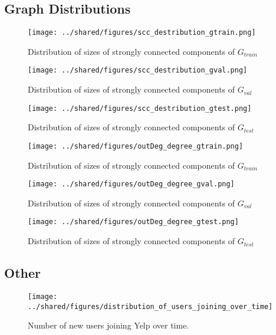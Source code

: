 \documentclass[letterpaper, 10 pt, conference]{ieeeconf}  %
\begin{document}
\subsection{Graph Distributions}
\label{sec:graph_distributions}
\begin{figure}[h!]
\centering
\texttt{[image: ../shared/figures/scc\_destribution\_gtrain.png]}
\caption{Distribution of sizes of strongly connected components of $G_{train}$}
\label{fig:distribution_scc_g_train}
\end{figure}
\begin{figure}[h!]
\centering
\texttt{[image: ../shared/figures/scc\_destribution\_gval.png]}
\caption{Distribution of sizes of strongly connected components of $G_{val}$}
\label{fig:distribution_scc_g_val}
\end{figure}
\begin{figure}[h!]
\centering
\texttt{[image: ../shared/figures/scc\_destribution\_gtest.png]}
\caption{Distribution of sizes of strongly connected components of $G_{test}$}
\label{fig:distribution_scc_g_test}
\end{figure}

\begin{figure}[h!]
\centering
\texttt{[image: ../shared/figures/outDeg\_degree\_gtrain.png]}
\caption{Distribution of sizes of strongly connected components of $G_{train}$}
\label{fig:degree_distribution_g_train}
\end{figure}
\begin{figure}[h!]
\centering
\texttt{[image: ../shared/figures/outDeg\_degree\_gval.png]}
\caption{Distribution of sizes of strongly connected components of $G_{val}$}
\label{fig:degree_distribution_g_val}
\end{figure}
\begin{figure}[h!]
\centering
\texttt{[image: ../shared/figures/outDeg\_degree\_gtest.png]}
\caption{Distribution of sizes of strongly connected components of $G_{test}$}
\label{fig:degree_distribution_g_test}
\end{figure}


\subsection{Other}


\begin{figure}[h!]
\centering
\texttt{[image: ../shared/figures/distribution\_of\_users\_joining\_over\_time]}
\caption{Number of new users joining Yelp over time.}
\label{fig:users_join_over_time}
\end{figure}
\end{document}
